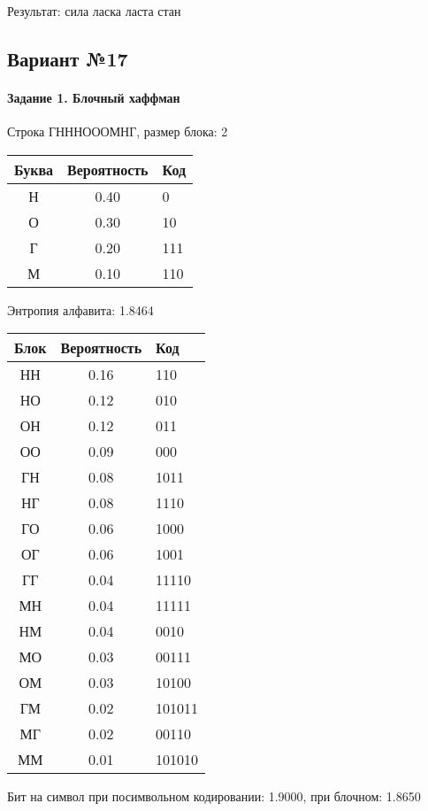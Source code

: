 \documentclass[a4paper, 12pt]{article}
\begin{document}
Результат: сила ласка ласта стан
\pagebreak
\subsection{Вариант №17}
\paragraph{Задание 1. Блочный хаффман \\}

Строка ГНННОООМНГ, размер блока: 2
\begin{center}
 \begin{tabular}{ |c|c|l| } 
  \hline
     Буква & Вероятность & Код\\ \hline
Н & 0.40 & 0\\\hline
О & 0.30 & 10\\\hline
Г & 0.20 & 111\\\hline
М & 0.10 & 110
\\ \hline \end{tabular}
\end{center}
Энтропия алфавита: 1.8464
\begin{center}
 \begin{tabular}{ |c|c|l| } 
  \hline
     Блок & Вероятность & Код\\ \hline
НН & 0.16 & 110\\\hline
НО & 0.12 & 010\\\hline
ОН & 0.12 & 011\\\hline
ОО & 0.09 & 000\\\hline
ГН & 0.08 & 1011\\\hline
НГ & 0.08 & 1110\\\hline
ГО & 0.06 & 1000\\\hline
ОГ & 0.06 & 1001\\\hline
ГГ & 0.04 & 11110\\\hline
МН & 0.04 & 11111\\\hline
НМ & 0.04 & 0010\\\hline
МО & 0.03 & 00111\\\hline
ОМ & 0.03 & 10100\\\hline
ГМ & 0.02 & 101011\\\hline
МГ & 0.02 & 00110\\\hline
ММ & 0.01 & 101010
\\ \hline \end{tabular}
\end{center}
Бит на символ при посимвольном кодировании: 1.9000, при блочном: 1.8650
\end{document}
